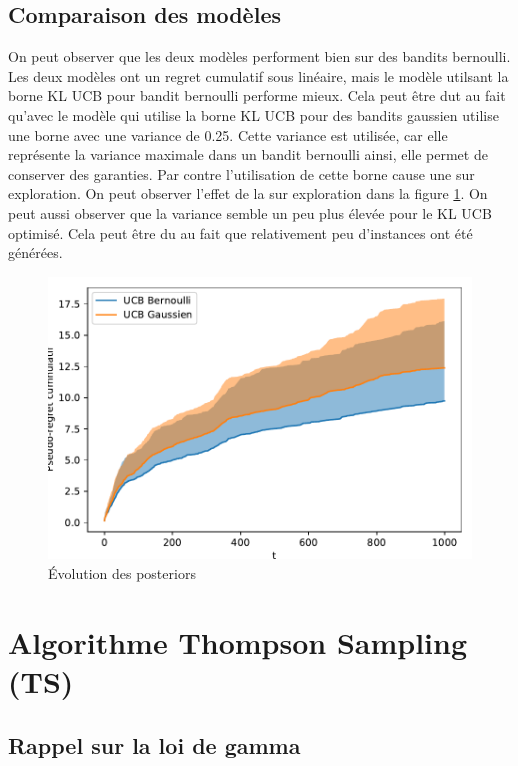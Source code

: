\documentclass[letterpaper,11pt]{article}
\begin{document}
\subsection{Comparaison des modèles}
On peut observer que les deux modèles performent bien sur des bandits bernoulli.
Les deux modèles ont un regret cumulatif sous linéaire, mais le modèle utilsant la borne KL UCB pour bandit bernoulli performe mieux.
Cela peut être dut au fait qu'avec le modèle qui utilise la borne KL UCB pour des bandits gaussien utilise une borne avec une variance de 0.25.
Cette variance est utilisée, car elle représente la variance maximale dans un bandit bernoulli ainsi, elle permet de conserver des garanties.
Par contre l'utilisation de cette borne cause une sur exploration.
On peut observer l'effet de la sur exploration dans la figure \ref{fig: kl_ucb}.
On peut aussi observer que la variance semble un peu plus élevée pour le KL UCB optimisé.
Cela peut être du au fait que relativement peu d'instances ont été générées.

\begin{figure}[H]
\caption{Évolution des posteriors}
\label{fig: kl_ucb}
\begin{center}

\includegraphics{figures/comparaison.pdf} \hfill
\end{center}
\end{figure}

\section{Algorithme Thompson Sampling (TS)}

\subsection{Rappel sur la loi de gamma}
\end{document}
